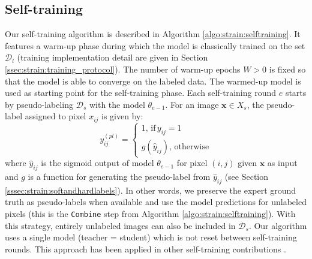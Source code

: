 \subsection{Self-training}
\label{ssec:strain:self_training}
 
Our self-training algorithm is described in Algorithm \ref{algo:strain:selftraining}. It features a warm-up phase during which the model is classically trained on the set $\mathcal{D}_l$ (training implementation detail are given in Section \ref{ssec:strain:training_protocol}). The number of warm-up epochs $W > 0$ is fixed so that the model is able to converge on the labeled data. The warmed-up model is used as starting point for the self-training phase. Each self-training round $e$ starts by pseudo-labeling $\mathcal{D}_s$ with the model $\theta_{e-1}$. For an image $\mathbf{x} \in X_s$, the pseudo-label assigned to pixel $x_{ij}$ is given by:
\begin{equation}
y^{({pl})}_{ij} = \begin{cases}
1,\,\text{if}\, y_{ij} = 1 \\
g(\hat{y}_{ij}),\,\text{otherwise}
\end{cases}
\label{eqn:strain:pseudolabeling}
\end{equation}
where $\hat{y}_{ij}$ is the sigmoid output of model $\theta_{e-1}$ for pixel $(i, j)$ given $\mathbf{x}$ as input and $g$ is a function for generating the pseudo-label from $\hat{y}_{ij}$ (see Section \ref{sssec:strain:softandhardlabels}). In other words, we preserve the expert ground truth as pseudo-labels when available and use the model predictions for unlabeled pixels (this is the \texttt{Combine} step from Algorithm \ref{algo:strain:selftraining}). With this strategy, entirely unlabeled images can also be included in $\mathcal{D}_s$. Our algorithm uses a single model (\ie teacher = student) which is not reset between self-training rounds. This approach has been applied in other self-training contributions \parencite{laine2016temporal, bai2017semi, li2018based}. 

